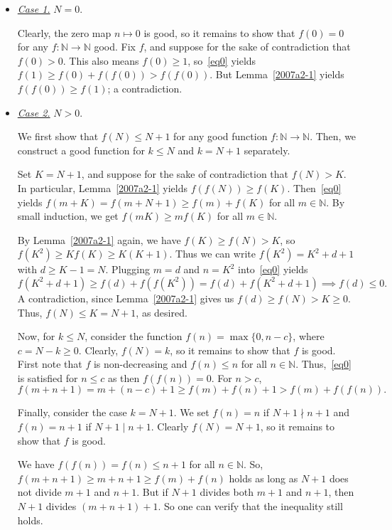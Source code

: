 \documentclass{article}
\newcommand{\N}{\mathbb{N}}
\begin{document}
\begin{itemize}

    \item
    \textit{\underline{Case 1.}}
    $N = 0$.

    Clearly, the zero map $n \mapsto 0$ is good, so it remains to show that $f(0) = 0$ for any $f : \N \to \N$ good.
    Fix $f$, and suppose for the sake of contradiction that $f(0) > 0$.
    This also means $f(0) \geq 1$, so~\eqref{eq0} yields $f(1) \geq f(0) + f(f(0)) > f(f(0))$.
    But Lemma~\ref{2007a2-1} yields $f(f(0)) \geq f(1)$; a contradiction.

    \item
    \textit{\underline{Case 2.}}
    $N > 0$.

    We first show that $f(N) \leq N + 1$ for any good function $f : \N \to \N$.
    Then, we construct a good function for $k \leq N$ and $k = N + 1$ separately.

    Set $K = N + 1$, and suppose for the sake of contradiction that $f(N) > K$.
    In particular, Lemma~\ref{2007a2-1} yields $f(f(N)) \geq f(K)$.
    Then~\eqref{eq0} yields $f(m + K) = f(m + N + 1) \geq f(m) + f(K)$ for all $m \in \N$.
    By small induction, we get $f(mK) \geq m f(K)$ for all $m \in \N$.

    By Lemma~\ref{2007a2-1} again, we have $f(K) \geq f(N) > K$, so $f(K^2) \geq K f(K) \geq K (K + 1)$.
    Thus we can write $f(K^2) = K^2 + d + 1$ with $d \geq K - 1 = N$.
    Plugging $m = d$ and $n = K^2$ into~\eqref{eq0} yields
    \[ f(K^2 + d + 1) \geq f(d) + f(f(K^2)) = f(d) + f(K^2 + d + 1) \implies f(d) \leq 0. \]
    A contradiction, since Lemma~\ref{2007a2-1} gives us $f(d) \geq f(N) > K \geq 0$.
    Thus, $f(N) \leq K = N + 1$, as desired.

    Now, for $k \leq N$, consider the function $f(n) = \max\{0, n - c\}$, where $c = N - k \geq 0$.
    Clearly, $f(N) = k$, so it remains to show that $f$ is good.
    First note that $f$ is non-decreasing and $f(n) \leq n$ for all $n \in \N$.
    Thus,~\eqref{eq0} is satisfied for $n \leq c$ as then $f(f(n)) = 0$.
    For $n > c$,
    \[ f(m + n + 1) = m + (n - c) + 1 \geq f(m) + f(n) + 1 > f(m) + f(f(n)). \]

    Finally, consider the case $k = N + 1$.
    We set $f(n) = n$ if $N + 1 \nmid n + 1$ and $f(n) = n + 1$ if $N + 1 \mid n + 1$.
    Clearly $f(N) = N + 1$, so it remains to show that $f$ is good.
    
    We have $f(f(n)) = f(n) \leq n + 1$ for all $n \in \N$.
    So, $f(m + n + 1) \geq m + n + 1 \geq f(m) + f(n)$ holds as long as $N + 1$ does not divide $m + 1$ and $n + 1$.
    But if $N + 1$ divides both $m + 1$ and $n + 1$, then $N + 1$ divides $(m + n + 1) + 1$.
    So one can verify that the inequality still holds.

\end{itemize}
\end{document}
